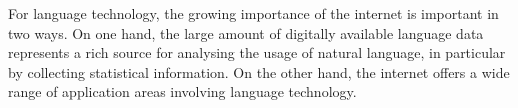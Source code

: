 \begin{multicols}{2}
For language technology, the growing importance of the internet is important in two ways. On one hand, the large amount of digitally available language data represents a rich source for analysing the usage of natural language, in particular by collecting statistical information. On the other hand, the internet offers a wide range of application areas involving language technology. 



\end{multicols}

\clearpage



